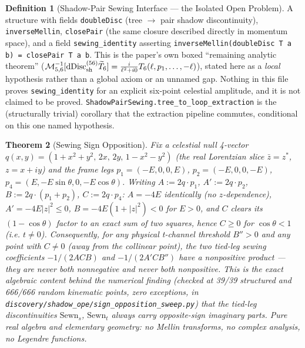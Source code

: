 \documentclass{report}
\newtheorem{theorem}{Theorem}[chapter]
\theoremstyle{definition}
\newtheorem{definition}[theorem]{Definition}
\begin{document}
\begin{definition}[Shadow-Pair Sewing Interface --- the Isolated Open Problem]
  \label{def:shadow-pair-sewing}
  A structure with fields \texttt{doubleDisc} (tree $\to$ pair shadow discontinuity),
  \texttt{inverseMellin}, \texttt{closePair} (the same closure described directly in
  momentum space), and a field \texttt{sewing\_identity} asserting
  \texttt{inverseMellin(doubleDisc T a b) = closePair T a b}. This is the paper's own
  boxed ``remaining analytic theorem''
  ($\mathcal M^{-1}_{5,6}[\mathrm{dDisc}_{\rm sh}^{(56)}\widetilde T_6] =
  \tfrac{i}{\ell^2+i0}T_6(\ell,p_1,\dots,-\ell)$), stated here as a \emph{local}
  hypothesis rather than a global axiom or an unnamed gap. Nothing in this file proves
  \texttt{sewing\_identity} for an explicit six-point celestial amplitude, and it is not
  claimed to be proved. \texttt{ShadowPairSewing.tree\_to\_loop\_extraction} is the
  (structurally trivial) corollary that the extraction pipeline commutes, conditional on
  this one named hypothesis.
\end{definition}

\begin{theorem}[Sewing Sign Opposition]
  \label{thm:shadow-sign-opposition}
  \leanok
  Fix a celestial null 4-vector $q(x,y) = (1+x^2+y^2,\,2x,\,2y,\,1-x^2-y^2)$ (the real
  Lorentzian slice $\bar z = z^*$, $z=x+iy$) and the frame legs $p_1=(-E,0,0,E)$,
  $p_2=(-E,0,0,-E)$, $p_4=(E,-E\sin\theta,0,-E\cos\theta)$. Writing $A := 2q{\cdot}p_1$,
  $A' := 2q{\cdot}p_2$, $B := 2q{\cdot}(p_1{+}p_2)$, $C := 2q{\cdot}p_4$: $A = -4E$
  identically (no $z$-dependence), $A' = -4E|z|^2 \le 0$, $B = -4E(1+|z|^2) < 0$ for
  $E>0$, and $C$ clears its $(1-\cos\theta)$ factor to an exact sum of two squares,
  hence $C \ge 0$ for $\cos\theta < 1$ (i.e. $t \ne 0$). Consequently, for any physical
  t-channel threshold $B''>0$ and any point with $C \ne 0$ (away from the collinear
  point), the two tied-leg sewing coefficients $-1/(2ACB)$ and $-1/(2A'CB'')$ have a
  nonpositive product --- they are never both nonnegative and never both nonpositive.
  This is the exact algebraic content behind the numerical finding (checked at 39/39
  structured and 666/666 random kinematic points, zero exceptions, in
  \texttt{discovery/shadow\_ope/sign\_opposition\_sweep.py}) that the tied-leg
  discontinuities $\mathrm{Sewn}_s$, $\mathrm{Sewn}_t$ always carry opposite-sign
  imaginary parts. Pure real algebra and elementary geometry: no Mellin transforms, no
  complex analysis, no Legendre functions.
\end{theorem}
\end{document}
